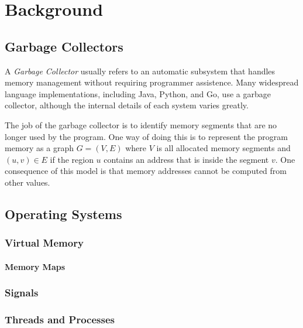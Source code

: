 \chapter{Background}


\section{Garbage Collectors}

A \emph{Garbage Collector} usually refers to an automatic subsystem that handles memory management
without requiring programmer assistence. Many widespread language implementations,
including Java, Python, and Go, use a garbage collector, although the internal details of each
system varies greatly.

The job of the garbage collector is to identify memory segments that are no longer used by the
program. One way of doing this is to represent the program memory as a graph $G=(V, E)$ where $V$ is
all allocated memory segments and $(u, v) \in E$ if the region $u$ contains an address that is
inside the segment $v$. One consequence of this model is that memory addresses cannot be computed
from other values.



\section{Operating Systems}
\lorem{}

\subsection{Virtual Memory}
\lorem{}

\subsubsection{Memory Maps\label{sec:memory-map}}
\lorem{}


\subsection{Signals}
\lorem{}


\subsection{Threads and Processes}
\lorem{}


